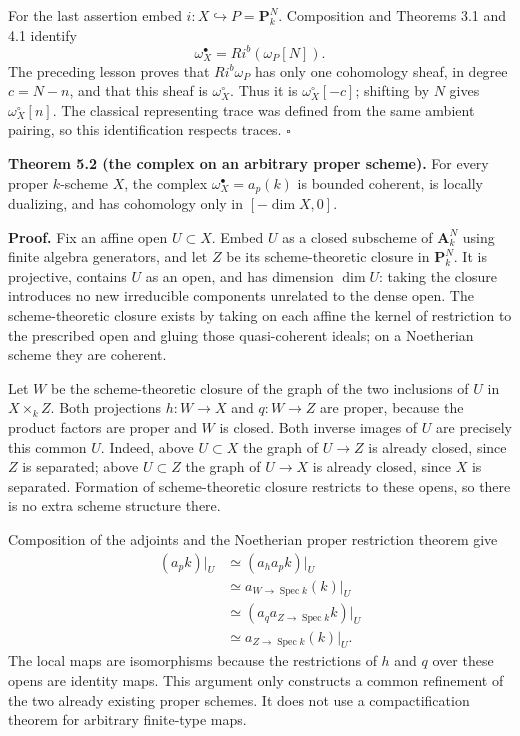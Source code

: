 \documentclass[11pt]{article}
\begin{document}
For the last assertion embed \(i:X\hookrightarrow P=\mathbf P^N_k\).
Composition and Theorems 3.1 and 4.1 identify \[
\omega_X^\bullet=Ri^b(\omega_P[N]).
\] The preceding lesson proves that \(Ri^b\omega_P\) has only one
cohomology sheaf, in degree \(c=N-n\), and that this sheaf is
\(\omega_X^\circ\). Thus it is \(\omega_X^\circ[-c]\); shifting by \(N\)
gives \(\omega_X^\circ[n]\). The classical representing trace was
defined from the same ambient pairing, so this identification respects
traces. \(\square\)

\textbf{Theorem 5.2 (the complex on an arbitrary proper scheme).} For
every proper \(k\)-scheme \(X\), the complex \(\omega_X^\bullet=a_p(k)\)
is bounded coherent, is locally dualizing, and has cohomology only in
\([-\dim X,0]\).

\textbf{Proof.} Fix an affine open \(U\subset X\). Embed \(U\) as a
closed subscheme of \(\mathbf A_k^N\) using finite algebra generators,
and let \(Z\) be its scheme-theoretic closure in \(\mathbf P_k^N\). It
is projective, contains \(U\) as an open, and has dimension \(\dim U\):
taking the closure introduces no new irreducible components unrelated to
the dense open. The scheme-theoretic closure exists by taking on each
affine the kernel of restriction to the prescribed open and gluing those
quasi-coherent ideals; on a Noetherian scheme they are coherent.

Let \(W\) be the scheme-theoretic closure of the graph of the two
inclusions of \(U\) in \(X\times_k Z\). Both projections \(h:W\to X\)
and \(q:W\to Z\) are proper, because the product factors are proper and
\(W\) is closed. Both inverse images of \(U\) are precisely this common
\(U\). Indeed, above \(U\subset X\) the graph of \(U\to Z\) is already
closed, since \(Z\) is separated; above \(U\subset Z\) the graph of
\(U\to X\) is already closed, since \(X\) is separated. Formation of
scheme-theoretic closure restricts to these opens, so there is no extra
scheme structure there.

Composition of the adjoints and the Noetherian proper restriction
theorem give \[
\begin{aligned}
(a_p k)|_U
&\simeq(a_h a_p k)|_U\\
&\simeq a_{W\to\operatorname{Spec}k}(k)|_U\\
&\simeq(a_q a_{Z\to\operatorname{Spec}k}k)|_U\\
&\simeq a_{Z\to\operatorname{Spec}k}(k)|_U.
\end{aligned}
\tag{5.A}
\] The local maps are isomorphisms because the restrictions of \(h\) and
\(q\) over these opens are identity maps. This argument only constructs
a common refinement of the two already existing proper schemes. It does
not use a compactification theorem for arbitrary finite-type maps.
\end{document}
